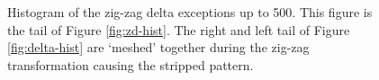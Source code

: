 \begin{figure}
	\centering

	\caption[Histogram of the zig-zag delta exceptions.]{\label{fig:ex-hist}Histogram of the zig-zag delta exceptions up to 500. This figure is the tail of Figure \ref{fig:zd-hist}. The right and left tail of Figure \ref{fig:delta-hist} are `meshed' together during the zig-zag transformation causing the stripped pattern.}
\end{figure}
